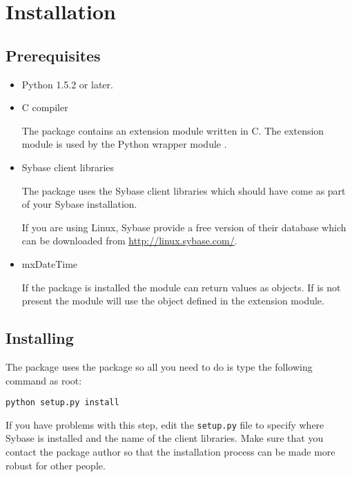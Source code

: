 \section{Installation}

\subsection{Prerequisites}

\begin{itemize}
\item Python 1.5.2 or later.

\item C compiler

The  package contains an extension module written in C.
The extension module is used by the Python wrapper module
.

\item Sybase client libraries

The  package uses the Sybase client libraries which
should have come as part of your Sybase installation.

If you are using Linux, Sybase provide a free version of their
database which can be downloaded from \url{http://linux.sybase.com/}.

\item mxDateTime

If the  package is installed the 
module can return  values as  objects.
If  is not present the module will use the
 object defined in the  extension
module.
\end{itemize}
\subsection{Installing}

The  package uses the  package so all
you need to do is type the following command as root:

\begin{verbatim}
python setup.py install
\end{verbatim}

If you have problems with this step, edit the \texttt{setup.py} file
to specify where Sybase is installed and the name of the client
libraries.  Make sure that you contact the package author so that the
installation process can be made more robust for other people.

